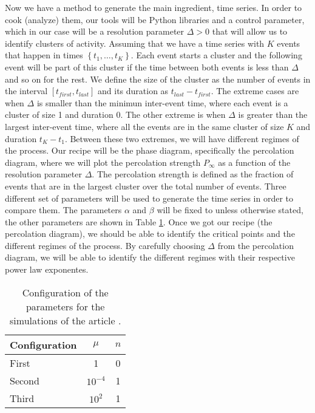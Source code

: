 Now we have a method to generate the main ingredient, time series. In order to cook (analyze) them, our tools will be Python libraries and a control parameter, which in our case will be 
a resolution parameter $\Delta >0$ that will allow us to identify clusters of activity. Assuming that we have a time series with $K$ events that happen in times $\left\{ t_1,\ldots, t_K \right\}$.
Each event starts a cluster and the following event will be part of this cluster if the time between both events is less than $\Delta$ and so on for the rest. We define the size of the cluster 
as the number of events in the interval $[t_{first},t_{last}]$ and its duration as $t_{last}-t_{first}$. The extreme cases are when $\Delta$ is smaller than the minimun inter-event time, 
where each event is a cluster of size 1 and duration 0. The other extreme is when $\Delta$ is greater than the largest inter-event time, where all the events are in the same cluster of size $K$
and duration $t_K-t_1$. Between these two extremes, we will have different regimes of the process. Our recipe will be the phase diagram, specifically the percolation diagram, where we will
plot the percolation strength $P_{\infty}$ as a function of the resolution parameter $\Delta$. The percolation strength is defined as the fraction of events that are in the largest cluster over
the total number of events. Three different set of parameters will be used to generate the time series in order to compare them. The parameters $\alpha$ and $\beta$ will be fixed to unless 
otherwise stated, the other parameters are shown in Table \ref{tab: parameters}. Once we got our recipe (the percolation diagram), we should be able to identify the critical points and the
different regimes of the process. By carefully choosing  $\Delta$ from the percolation diagram, we will be able to identify the different regimes with their respective power law exponentes. 


\begin{table}[H]
    \centering
    \caption{Configuration of the parameters for the simulations of the article \cite{notarmuzi2021percolation}.}
    \label{tab: parameters}
    \begin{tabular}{@{}lcc@{}}
    \toprule
    Configuration & \multicolumn{1}{c}{$\mu$} & \multicolumn{1}{c}{$n$} \\ \midrule
    First & 1 & 0 \\
    Second & $10^{-4}$ & 1 \\
    Third & $10^2$ & 1 \\ \bottomrule
    \end{tabular}
\end{table}

